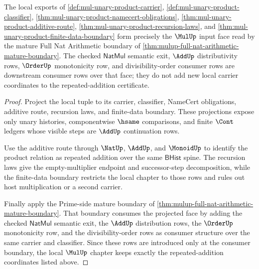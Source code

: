 \begin{theorem}
\label{thm:mulup-local-to-full-nat-arithmetic-handoff}
The local exports of \autoref{def:mul-unary-product-carrier}, \autoref{def:mul-unary-product-classifier}, \autoref{thm:mul-unary-product-namecert-obligations}, \autoref{thm:mul-unary-product-additive-route}, \autoref{thm:mul-unary-product-recursion-laws}, and \autoref{thm:mul-unary-product-finite-data-boundary} form precisely the $\MulUp$ input face read by the mature Full Nat Arithmetic boundary of \autoref{thm:mulup-full-nat-arithmetic-mature-boundary}. The checked $\mathsf{NatMul}$ semantic exit, $\AddUp$ distributivity rows, $\OrderUp$ monotonicity row, and divisibility-order consumer rows are downstream consumer rows over that face; they do not add new local carrier coordinates to the repeated-addition certificate.
\end{theorem}
\begin{proof}
Project the local tuple to its carrier, classifier, NameCert obligations, additive route, recursion laws, and finite-data boundary. These projections expose only unary histories, componentwise $\hsame$ comparisons, and finite $\Cont$ ledgers whose visible steps are $\AddUp$ continuation rows.

Use the additive route through $\NatUp$, $\AddUp$, and $\MonoidUp$ to identify the product relation as repeated addition over the same $\mathsf{BHist}$ spine. The recursion laws give the empty-multiplier endpoint and successor-step decomposition, while the finite-data boundary restricts the local chapter to those rows and rules out host multiplication or a second carrier.

Finally apply the Prime-side mature boundary of \autoref{thm:mulup-full-nat-arithmetic-mature-boundary}. That boundary consumes the projected face by adding the checked $\mathsf{NatMul}$ semantic exit, the $\AddUp$ distribution rows, the $\OrderUp$ monotonicity row, and the divisibility-order rows as consumer structure over the same carrier and classifier. Since these rows are introduced only at the consumer boundary, the local $\MulUp$ chapter keeps exactly the repeated-addition coordinates listed above.
\end{proof}


